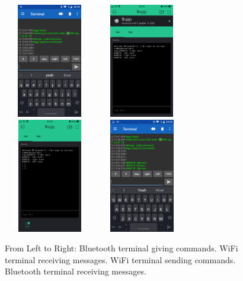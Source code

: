 \documentclass[8pt, a4paper]{article}
\begin{document}
	\begin{figure}[H]
		\centering
		\includegraphics[height=5.0cm, width=4.0cm]{BLE_term}
		\includegraphics[height=5.0cm, width=4.0cm]{blynk_term2}
		\includegraphics[height=5.0cm, width=4.0cm]{blynk_term}
		\includegraphics[height=5.0cm, width=4.0cm]{BLE_term2}
		\caption{From Left to Right: Bluetooth terminal giving commands. WiFi terminal receiving messages. WiFi terminal sending commands. Bluetooth terminal receiving messages.}			
	\end{figure}
	
\end{document}
